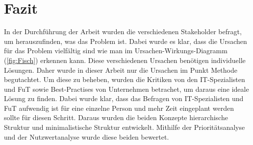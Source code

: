 \chapter{Fazit}
\label{ch:chapter06}
In der Durchführung der Arbeit wurden die verschiedenen Stakeholder befragt, um herauszufinden, was das Problem ist.
Dabei wurde es klar, dass die Ursachen für das Problem vielfältig sind wie man im Ursachen-Wirkungs-Diagramm (\ref{fig:Fisch}) erkennen kann.
Diese verschiedenen Ursachen benötigen individuelle Lösungen.
Daher wurde in dieser Arbeit nur die Ursachen im Punkt Methode begutachtet.
Um diese zu beheben, wurden die Kritiken von den IT-Spezialisten und \ac{FuT} sowie Best-Practises von Unternehmen betrachet, um daraus eine ideale Lösung zu finden.
Dabei wurde klar, dass das Befragen von IT-Spezialisten und \ac{FuT} aufwendig ist für eine einzelne Person und mehr Zeit eingeplant werden sollte für diesen Schritt.
Daraus wurden die beiden Konzepte hierarchische Struktur und minimalistische Struktur entwickelt.
Mithilfe der Prioritätsanalyse und der Nutzwertanalyse wurde diese beiden bewertet.

